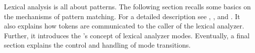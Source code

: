Lexical analysis is all about patterns. The following section recalls some
basics on the mechanisms of pattern matching. For a detailed description see
\cite{}, \cite{}, and \cite{}. It also explains how tokens are communicated to
the caller of the lexical analyzer.  Further, it introduces the {\quex}'s
concept of lexical analyzer modes.  Eventually, a final section explains the
control and handling of mode transitions.

